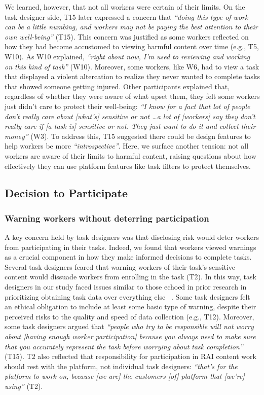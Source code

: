We learned, however, that not all workers were certain of their limits. On the task designer side, T15 later expressed a concern that \textit{``doing this type of work can be a little numbing, and workers may not be paying the best attention to their own well-being''} (T15). This concern was justified as some  workers reflected on how they had become accustomed to viewing harmful content over time (e.g., T5, W10). As W10 explained, \textit{``right about now, I'm used to reviewing and working on this kind of task''} (W10). Moreover, some workers, like W6, had to view a task that displayed a violent altercation to realize they never wanted to complete tasks that showed someone getting injured. Other participants explained that, regardless of whether they were aware of what upset them, they felt some workers just didn't care to protect their well-being: \textit{``I know for a fact that lot of people don't really care about [what's] sensitive or not \dots a lot of [workers] say they don't really care if [a task is] sensitive or not. They just want to do it and collect their money''} (W3). To address this, T15 suggested there could be design features to help workers be more \textit{``introspective''}. Here, we surface another tension:  not all workers are aware of their limits to harmful content, raising questions about how effectively they can use platform features like task filters to protect themselves.

\subsection{Decision to Participate}
\subsubsection{Warning workers without deterring participation}
A key concern held by task designers was that disclosing risk would deter workers from participating in their tasks. Indeed, we found that workers viewed warnings as a crucial component in how they make informed decisions to complete tasks. Several task designers feared that warning workers of their task's sensitive content would dissuade workers from enrolling in the task (T2). In this way, task designers in our study faced issues similar to those echoed in prior research in prioritizing obtaining task data over everything else ~\cite{qian2025locating, finnerty2013keep, kittur2008crowdsourcing}. Some task designers felt an ethical obligation to include at least some basic type of warning, despite their perceived risks to the quality and speed of data collection (e.g., T12). Moreover, some task designers argued that \textit{``people who try to be responsible will not worry about [having enough worker participation] because you always need to make sure that you accurately represent the task before worrying about task completion''} (T15). T2 also reflected that responsibility for participation in RAI content work should rest with the platform, not individual task designers: \textit{``that's for the platform to work on, because [we are] the customers [of] platform that [we're] using''} (T2). 

